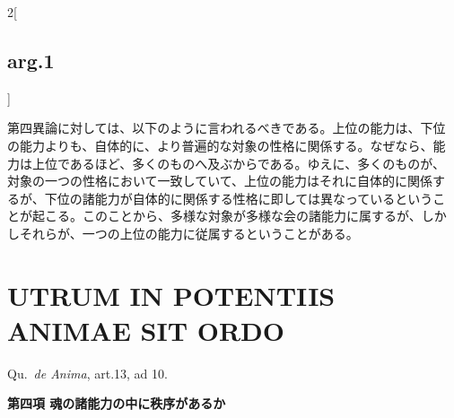 \documentclass[paper=a4paper,fontsize=10pt,jafontsize=9pt,titlepage]{jlreq}
\begin{document}
\begin{paracol}{2}[\subsection{arg.1}]
  
\switchcolumn

第四異論に対しては、以下のように言われるべきである。上位の能力は、下位
の能力よりも、自体的に、より普遍的な対象の性格に関係する。なぜなら、能
力は上位であるほど、多くのものへ及ぶからである。ゆえに、多くのものが、
対象の一つの性格において一致していて、上位の能力はそれに自体的に関係す
るが、下位の諸能力が自体的に関係する性格に即しては異なっているというこ
とが起こる。このことから、多様な対象が多様な会の諸能力に属するが、しか
しそれらが、一つの上位の能力に従属するということがある。


\end{paracol}

\newpage

\section{UTRUM IN POTENTIIS ANIMAE SIT ORDO}
{\footnotesize Qu.~{\itshape de Anima}, art.13, ad 10.}

\vspace{1em}
\textbf{{\Large 第四項  魂の諸能力の中に秩序があるか}}
\vspace{2em}
\end{document}
